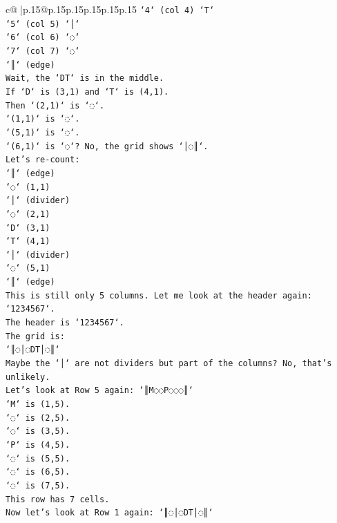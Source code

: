 \documentclass{article}
\begin{document}
{\begin{supertabular}{c@{$\;$}|p{.15\linewidth}@{}p{.15\linewidth}p{.15\linewidth}p{.15\linewidth}p{.15\linewidth}p{.15\linewidth}}
{{{\texttt{`4` (col 4) `T`} \\
\texttt{`5` (col 5) `│`} \\
\texttt{`6` (col 6) `◌`} \\
\texttt{`7` (col 7) `◌`} \\
\texttt{`║` (edge)} \\
\texttt{Wait, the `DT` is in the middle.} \\
\texttt{If `D` is (3,1) and `T` is (4,1).} \\
\texttt{Then `(2,1)` is `◌`.} \\
\texttt{`(1,1)` is `◌`.} \\
\texttt{`(5,1)` is `◌`.} \\
\texttt{`(6,1)` is `◌`? No, the grid shows `│◌║`.} \\
\texttt{Let's re{-}count:} \\
\texttt{`║` (edge)} \\
\texttt{`◌` (1,1)} \\
\texttt{`│` (divider)} \\
\texttt{`◌` (2,1)} \\
\texttt{`D` (3,1)} \\
\texttt{`T` (4,1)} \\
\texttt{`│` (divider)} \\
\texttt{`◌` (5,1)} \\
\texttt{`║` (edge)} \\
\texttt{This is still only 5 columns. Let me look at the header again: `1234567`.} \\
\texttt{The header is `1234567`.} \\
\texttt{The grid is:} \\
\texttt{`║◌│◌DT│◌║`} \\
\texttt{Maybe the `│` are not dividers but part of the columns? No, that's unlikely.} \\
\texttt{Let's look at Row 5 again: `║M◌◌P◌◌◌║`} \\
\texttt{`M` is (1,5).} \\
\texttt{`◌` is (2,5).} \\
\texttt{`◌` is (3,5).} \\
\texttt{`P` is (4,5).} \\
\texttt{`◌` is (5,5).} \\
\texttt{`◌` is (6,5).} \\
\texttt{`◌` is (7,5).} \\
\texttt{This row has 7 cells.} \\
\texttt{Now let's look at Row 1 again: `║◌│◌DT│◌║`} \\
}}}
\end{supertabular}}
\end{document}
